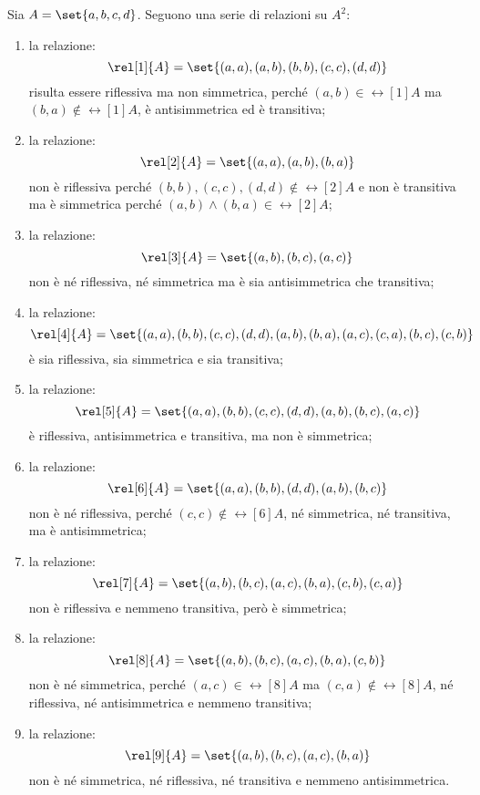 \begin{examples}
    Sia \(A = \set{a, b, c, d}\). Seguono una serie di relazioni su \(A^2\):
    \begin{enumerate}
        \item la relazione:
            \[
                \rel[1]{A} = \set{(a, a), (a, b), (b, b), (c, c), (d, d)}
            \]
            risulta essere riflessiva ma non simmetrica, perché \((a, b) \in \rel[1]{A}\) ma \((b, a) \notin \rel[1]{A}\), è antisimmetrica ed è transitiva;
%
        \item la relazione:
            \[
                \rel[2]{A} = \set{(a, a), (a, b), (b, a)}
            \]
            non è riflessiva perché \((b, b), (c, c), (d, d) \notin \rel[2]{A}\) e non è transitiva ma è simmetrica perché \((a, b) \land (b, a) \in \rel[2]{A}\);
%
        \item la relazione:
            \[
                \rel[3]{A} = \set{(a, b), (b, c), (a, c)}
            \]
            non è né riflessiva, né simmetrica ma è sia antisimmetrica che transitiva;
%
        \item la relazione:
            \[
                \rel[4]{A} = \set{(a, a), (b, b), (c, c), (d, d), (a, b), (b, a), (a, c), (c, a), (b, c), (c, b)}
            \]
            è sia riflessiva, sia simmetrica e sia transitiva;
%
        \item la relazione:
            \[
                \rel[5]{A} = \set{(a, a), (b, b), (c, c), (d, d), (a, b), (b, c), (a, c)}
            \]
            è riflessiva, antisimmetrica e transitiva, ma non è simmetrica;
%
        \item la relazione:
            \[
                \rel[6]{A} = \set{(a, a), (b, b), (d, d), (a, b), (b, c)}
            \]
            non è né riflessiva, perché \((c, c) \notin \rel[6]{A}\), né simmetrica, né transitiva, ma è antisimmetrica;
%
        \item la relazione:
            \[
                \rel[7]{A} = \set{(a, b), (b, c), (a, c), (b, a), (c, b), (c, a)}
            \]
            non è riflessiva e nemmeno transitiva, però è simmetrica;
%
        \item la relazione:
            \[
                \rel[8]{A} = \set{(a, b), (b, c), (a, c), (b, a), (c, b)}
            \]
            non è né simmetrica, perché \((a, c) \in \rel[8]{A}\) ma \((c, a) \notin \rel[8]{A}\), né riflessiva, né antisimmetrica e nemmeno transitiva;
%
        \item la relazione:
            \[
                \rel[9]{A} = \set{(a, b), (b, c), (a, c), (b, a)}
            \]
            non è né simmetrica, né riflessiva, né transitiva e nemmeno antisimmetrica.
    \end{enumerate}
\end{examples}

